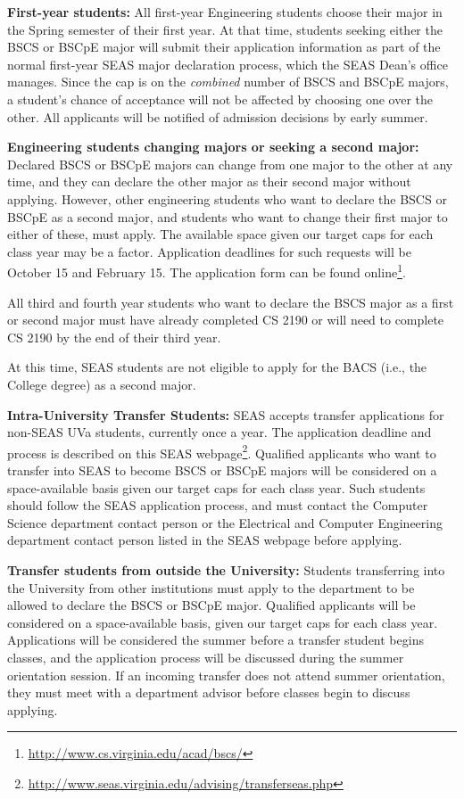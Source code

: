 \documentclass[10pt,letter]{book}
\newcommand{\myurl}[1]{\footnote{\scriptsize\url{#1}}}
\begin{document}
{\bf First-year students:} All first-year Engineering students choose
their major in the Spring semester of their first year. At that time,
students seeking either the BSCS or BSCpE major will submit their
application information as part of the normal first-year SEAS major
declaration process, which the SEAS Dean's office manages. Since the
cap is on the {\em combined} number of BSCS and BSCpE majors, a
student's chance of acceptance will not be affected by choosing one
over the other. All applicants will be notified of admission decisions
by early summer.

{\bf Engineering students changing majors or seeking a second major:}
Declared BSCS or BSCpE majors can change from one major to the other
at any time, and they can declare the other major as their second
major without applying. However, other engineering students who want
to declare the BSCS or BSCpE as a second major, and students who want
to change their first major to either of these, must apply. The
available space given our target caps for each class year may be a
factor. Application deadlines for such requests will be October 15 and
February 15. The application form can be found
online\myurl{http://www.cs.virginia.edu/acad/bscs/}.

All third and fourth year students who want to declare the BSCS major
as a first or second major must have already completed CS 2190 or will
need to complete CS 2190 by the end of their third year.

At this time, SEAS students are not eligible to apply for the BACS
(i.e., the College degree) as a second major.

{\bf Intra-University Transfer Students:} SEAS accepts transfer
applications for non-SEAS UVa students, currently once a year. The
application deadline and process is described on this SEAS
webpage\myurl{http://www.seas.virginia.edu/advising/transferseas.php}.
Qualified applicants who want to transfer into SEAS to become BSCS or
BSCpE majors will be considered on a space-available basis given our
target caps for each class year. Such students should follow the SEAS
application process, and must contact the Computer Science department
contact person or the Electrical and Computer Engineering department
contact person listed in the SEAS webpage before applying.

{\bf Transfer students from outside the University:} Students
transferring into the University from other institutions must apply to
the department to be allowed to declare the BSCS or BSCpE major.
Qualified applicants will be considered on a space-available basis,
given our target caps for each class year. Applications will be
considered the summer before a transfer student begins classes, and
the application process will be discussed during the summer
orientation session. If an incoming transfer does not attend summer
orientation, they must meet with a department advisor before classes
begin to discuss applying.
\end{document}
